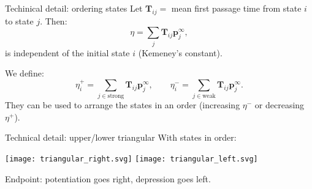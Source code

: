 \documentclass{beamer}%
\newcommand{\pr}{\mathbf{p}}
\newcommand{\eq}{\pr^\infty}
\newcommand{\fpt}{\mathbf{T}}
\begin{document}

\begin{frame}[label=fr_tech]{Techinical detail: ordering states}
%
 Let $\fpt_{ij}=$ mean first passage time from state $i$ to state $j$.
 Then:
 \begin{equation*}
   \eta = \sum_j \fpt_{ij} \eq_j,
 \end{equation*}
 is independent of the initial state $i$
 (Kemeney's constant).\\ 

 \vp We define:
 \begin{equation*}
   \eta^+_i = \sum_{j\in\text{strong}} \fpt_{ij} \eq_j,
   \qquad
   \eta^-_i = \sum_{j\in\text{weak}} \fpt_{ij} \eq_j.
 \end{equation*}
 They can be used to arrange the states in an order (increasing $\eta^-$ or decreasing $\eta^+$).
 \hyperlink{fr_areaproof}{}
%
\end{frame}


\begin{frame}{Technical detail: upper/lower triangular}
%
 With states in order:
 \begin{center}
   \texttt{[image: triangular\_right.svg]}
   \hp \hp \hp
   \texttt{[image: triangular\_left.svg]}
 \end{center}
 Endpoint: potentiation goes right, depression goes left.

 \hyperlink{fr_areaproof}{}
%
\end{frame}


\end{document}

